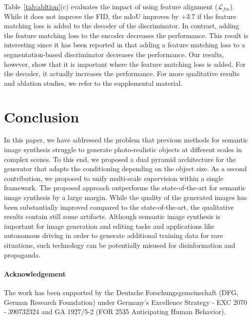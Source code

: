 \documentclass{bmvc2k}
\begin{document}
Table~\ref{tab:abltion}(c) evaluates the impact of using feature alignment ($\mathcal{L}_{fm}$). 
While it does not improve the FID, the mIoU improves by +3.7 if the feature matching loss is added to the decoder of the discriminator. In contrast, adding the feature matching loss to the encoder decreases the performance. This result is interesting since it has been reported in \cite{schonfeld_sushko_iclr2021} that adding a feature matching loss to a segmentation-based discriminator decreases the performance. Our results, however, show that it is important where the feature matching loss is added. For the decoder, it actually increases the performance. For more qualitative results and ablation studies, we refer to the supplemental material.









\section{Conclusion}
\label{sec:conclusion}

In this paper, we have addressed the problem that previous methods for semantic image synthesis struggle to generate photo-realistic objects at different scales in complex scenes. To this end, we proposed a dual pyramid architecture for the generator that adapts the conditioning depending on the object size. As a second contribution, we proposed to unify multi-scale supervision within a single framework. The proposed approach outperforms the state-of-the-art for semantic image synthesis by a large margin. While the quality of the generated images has been substantially improved compared to the state-of-the-art, the qualitative results contain still some artifacts. Although semantic image synthesis is important for image generation and editing tasks and applications like autonomous driving in order to generate additional training data for rare situations, such technology can be potentially misused for disinformation and propaganda.  

\paragraph{Acknowledgement}
The work has been supported by the Deutsche Forschungsgemeinschaft (DFG, German Research Foundation) under Germany’s Excellence Strategy - EXC 2070 - 390732324 and GA 1927/5-2 (FOR 2535 Anticipating Human Behavior).






\end{document}

